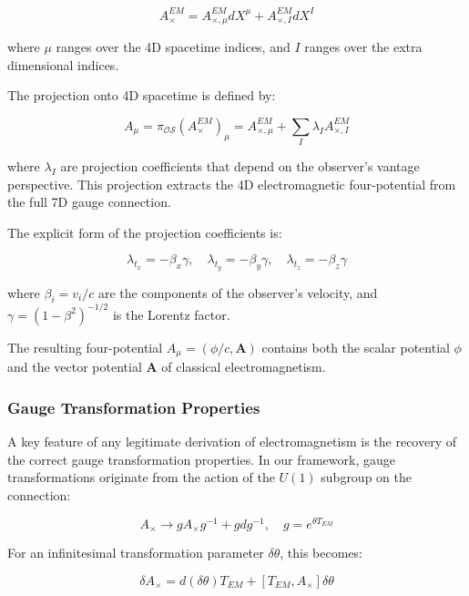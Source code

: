 \documentclass{article}
\begin{document}
\begin{equation}
A^{EM}_{\times} = A^{EM}_{\times, \mu} dX^{\mu} + A^{EM}_{\times, I} dX^{I}
\end{equation}

where $\mu$ ranges over the 4D spacetime indices, and $I$ ranges over the extra dimensional indices.

The projection onto 4D spacetime is defined by:

\begin{equation}
A_{\mu} = \pi_{\mathcal{OS}}(A^{EM}_{\times})_{\mu} = A^{EM}_{\times, \mu} + \sum_I \lambda_I A^{EM}_{\times, I}
\end{equation}

where $\lambda_I$ are projection coefficients that depend on the observer's vantage perspective. This projection extracts the 4D electromagnetic four-potential from the full 7D gauge connection.

The explicit form of the projection coefficients is:

\begin{equation}
\lambda_{t_x} = -\beta_x \gamma, \quad \lambda_{t_y} = -\beta_y \gamma, \quad \lambda_{t_z} = -\beta_z \gamma
\end{equation}

where $\beta_i = v_i/c$ are the components of the observer's velocity, and $\gamma = (1 - \beta^2)^{-1/2}$ is the Lorentz factor.

The resulting four-potential $A_{\mu} = (\phi/c, \mathbf{A})$ contains both the scalar potential $\phi$ and the vector potential $\mathbf{A}$ of classical electromagnetism.

\subsubsection{Gauge Transformation Properties}

A key feature of any legitimate derivation of electromagnetism is the recovery of the correct gauge transformation properties. In our framework, gauge transformations originate from the action of the $U(1)$ subgroup on the connection:

\begin{equation}
A_{\times} \rightarrow g A_{\times} g^{-1} + g d g^{-1}, \quad g = e^{\theta T_{EM}}
\end{equation}

For an infinitesimal transformation parameter $\delta\theta$, this becomes:

\begin{equation}
\delta A_{\times} = d(\delta\theta) T_{EM} + [T_{EM}, A_{\times}] \delta\theta
\end{equation}
\end{document}
